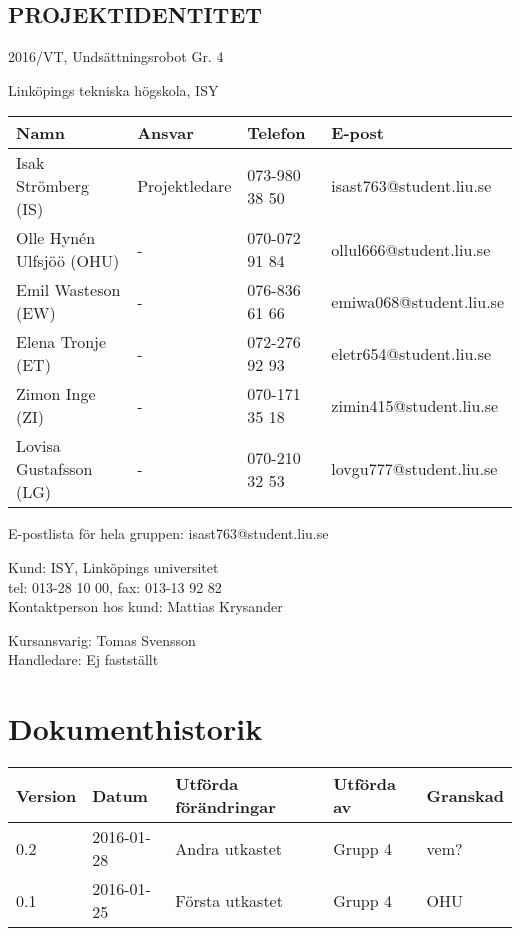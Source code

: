 \documentclass[11pt]{article}
\begin{document}
\pagebreak
\begin{center}

\section*{PROJEKTIDENTITET}
2016/VT, Undsättningsrobot Gr. 4

Linköpings tekniska högskola, ISY
\vspace{5em}
\begin{center}

\begin{tabular}{|l|l|l|l|} \hline
\textbf{Namn} & \textbf{Ansvar} & \textbf{Telefon} & \textbf{E-post}  \\ \hline 
Isak Strömberg (IS) & Projektledare & 073-980 38 50 & isast763@student.liu.se \\ \hline
Olle Hynén Ulfsjöö (OHU)& - & 070-072 91 84 & ollul666@student.liu.se \\ \hline
Emil Wasteson (EW) & - & 076-836 61 66 & emiwa068@student.liu.se \\ \hline
Elena Tronje (ET) & - & 072-276 92 93 & eletr654@student.liu.se \\ \hline
Zimon Inge (ZI)& - & 070-171 35 18 & zimin415@student.liu.se \\ \hline
Lovisa Gustafsson (LG) & - & 070-210 32 53 & lovgu777@student.liu.se \\ \hline
\end{tabular}

\end{center}

E-postlista för hela gruppen: isast763@student.liu.se

\vspace{5em}
Kund: ISY, Linköpings universitet \\
tel: 013-28 10 00, fax: 013-13 92 82 \\
Kontaktperson hos kund: Mattias Krysander

\vspace{5em}
Kursansvarig:  Tomas Svensson\\
Handledare: Ej fastställt
\end{center}
\pagebreak

\tableofcontents

\pagebreak

\section*{Dokumenthistorik}
\begin{table}[h]
\begin{tabular}{|l|l|l|l|l|} \hline

\textbf{Version} & \textbf{Datum} & \textbf{Utförda förändringar} & \textbf{Utförda av} & \textbf{Granskad} \\ \hline
0.2 & 2016-01-28 & Andra utkastet & Grupp 4 & vem?\\ \hline
0.1 & 2016-01-25 &  Första utkastet & Grupp 4 & OHU \\ \hline
\end{tabular}
\end{table}
\end{document}
